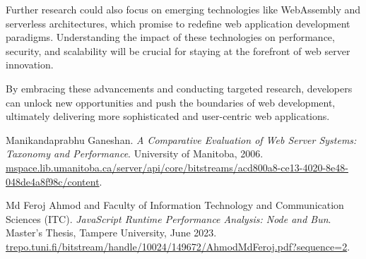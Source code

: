 \documentclass[conference]{IEEEtran}
\begin{document}
Further research could also focus on emerging technologies like WebAssembly and serverless architectures, which promise to redefine web application development paradigms. Understanding the impact of these technologies on performance, security, and scalability will be crucial for staying at the forefront of web server innovation.

By embracing these advancements and conducting targeted research, developers can unlock new opportunities and push the boundaries of web development, ultimately delivering more sophisticated and user-centric web applications.



\begin{thebibliography}{00}

Manikandaprabhu Ganeshan.
\textit{A Comparative Evaluation of Web Server Systems: Taxonomy and Performance}.
University of Manitoba, 2006.
\url{mspace.lib.umanitoba.ca/server/api/core/bitstreams/acd800a8-ce13-4020-8e48-048de4a8f98c/content}.

Md Feroj Ahmod and Faculty of Information Technology and Communication Sciences (ITC).
\textit{JavaScript Runtime Performance Analysis: Node and Bun}.
Master’s Thesis, Tampere University, June 2023.
\url{trepo.tuni.fi/bitstream/handle/10024/149672/AhmodMdFeroj.pdf?sequence=2}.

\end{thebibliography}
\vspace{12pt}
\end{document}
